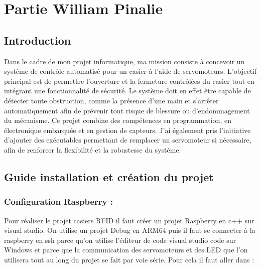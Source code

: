 \documentclass[main.tex]{subfiles}
\begin{document}

\section{Partie William Pinalie}

\subsection{Introduction}

Dans le cadre de mon projet informatique, ma mission consiste à concevoir un
système de contrôle automatisé pour un casier à l’aide de servomoteurs. L’objectif
principal est de permettre l’ouverture et la fermeture contrôlées du casier tout en
intégrant une fonctionnalité de sécurité. Le système doit en effet être capable de
détecter toute obstruction, comme la présence d’une main et s’arrêter
automatiquement afin de prévenir tout risque de blessure ou d’endommagement du
mécanisme. Ce projet combine des compétences en programmation, en électronique
embarquée et en gestion de capteurs. J’ai également pris l’initiative d’ajouter des
exécutables permettant de remplacer un servomoteur si nécessaire, afin de renforcer
la flexibilité et la robustesse du système.

\subsection{Guide installation et création du projet}

\subsubsection{Configuration Raspberry :}

\quad Pour réaliser le projet casiers RFID il faut créer un projet Raspberry en c++ sur visual studio. On utilise un projet Debug en ARM64 puis il faut se connecter à la raspberry en ssh parce qu’on utilise l’éditeur de code visual studio code sur Windows et parce que la communication des servomoteurs et des LED que l’on utilisera tout au long du projet se fait par voie série. Pour cela il faut aller dans :
\end{document}
